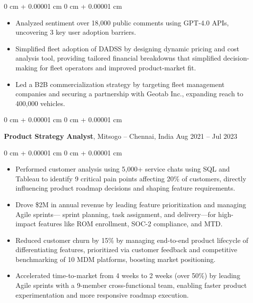 \documentclass[10pt, letterpaper]{article}
\newenvironment{highlights}{
    \begin{itemize}[
        topsep=0.10 cm,
        parsep=0.10 cm,
        partopsep=0pt,
        itemsep=0pt,
        leftmargin=0 cm + 10pt
    ]
}{
    \end{itemize}
} %
\newenvironment{onecolentry}{
    \begin{adjustwidth}{
        0 cm + 0.00001 cm
    }{
        0 cm + 0.00001 cm
    }
}{
    \end{adjustwidth}
} %
\newenvironment{twocolentry}[2][]{
    \onecolentry
    \def\secondColumn{#2}
    \setcolumnwidth{\fill, 4.5 cm}
    \begin{paracol}{2}
}{
    \switchcolumn \raggedleft \secondColumn
    \end{paracol}
    \endonecolentry
} %
\begin{document}
        \vspace{0.10 cm}
        \begin{onecolentry}
            \begin{highlights}
                \item Analyzed sentiment over 18,000 public comments using GPT-4.0 APIs, uncovering 3 key user adoption barriers.
                \item Simplified fleet adoption of DADSS by designing dynamic pricing and cost analysis tool, providing tailored financial breakdowns that simplified decision-making for fleet operators and improved product-market fit.
                \item Led a B2B commercialization strategy by targeting fleet management companies and securing a partnership with Geotab Inc., expanding reach to 400,000 vehicles.
                

            \end{highlights}
        \end{onecolentry}
        \vspace{0.2 cm}

        \begin{twocolentry}{
            Aug 2021 – Jul 2023
        }
            \textbf{Product Strategy Analyst}, Mitsogo -- Chennai, India\end{twocolentry}

        \vspace{0.10 cm}
        \begin{onecolentry}
            \begin{highlights}
                \item Performed customer analysis using 5,000+ service chats using SQL and Tableau to identify 9 critical pain points affecting 20\% of customers, directly influencing product roadmap decisions and shaping feature requirements.

                \item Drove \$2M in annual revenue by leading feature prioritization and managing Agile sprints— sprint planning, task assignment, and delivery—for high-impact features like ROM enrollment, SOC-2 compliance, and MTD.

                \item Reduced customer churn by 15\% by managing end-to-end product lifecycle of differentiating features, prioritized via customer feedback and competitive benchmarking of 10 MDM platforms, boosting market positioning.

                \item Accelerated time-to-market from 4 weeks to 2 weeks (over 50\%) by leading Agile sprints with a 9-member cross-functional team, enabling faster product experimentation and more responsive roadmap execution.

            \end{highlights}
        \end{onecolentry}
\end{document}
